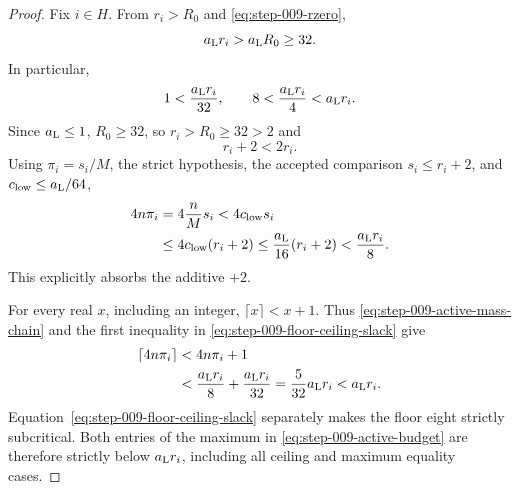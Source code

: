 \begin{proof}
Fix \(i\in H\).  From \(r_i>R_0\) and
\eqref{eq:step-009-rzero},
\begin{equation}\label{eq:step-009-active-slack}
a_{\rm L}r_i>a_{\rm L}R_0\ge32.
\end{equation}
In particular,
\begin{equation}\label{eq:step-009-floor-ceiling-slack}
1<\frac{a_{\rm L}r_i}{32},
\qquad
8<\frac{a_{\rm L}r_i}{4}<a_{\rm L}r_i.
\end{equation}
Since \(a_{\rm L}\le1\), \(R_0\ge32\), so
\(r_i>R_0\ge32>2\) and
\begin{equation}\label{eq:step-009-plus-two}
r_i+2<2r_i.
\end{equation}
Using \(\pi_i=s_i/M\), the strict hypothesis, the accepted comparison
\(s_i\le r_i+2\), and \(c_{\rm low}\le a_{\rm L}/64\),
\begin{equation}\label{eq:step-009-active-mass-chain}
\begin{split}
4n\pi_i
&=4\frac nM s_i
<4c_{\rm low}s_i\\
&\le4c_{\rm low}(r_i+2)
\le\frac{a_{\rm L}}{16}(r_i+2)
<\frac{a_{\rm L}r_i}{8}.
\end{split}
\end{equation}
This explicitly absorbs the additive \(+2\).

For every real \(x\), including an integer, \(\lceil x\rceil<x+1\).
Thus \eqref{eq:step-009-active-mass-chain} and the first inequality in
\eqref{eq:step-009-floor-ceiling-slack} give
\begin{equation}\label{eq:step-009-ceiling-absorption}
\begin{split}
\left\lceil4n\pi_i\right\rceil
&<4n\pi_i+1\\
&<\frac{a_{\rm L}r_i}{8}
 +\frac{a_{\rm L}r_i}{32}
=\frac5{32}a_{\rm L}r_i
<a_{\rm L}r_i.
\end{split}
\end{equation}
Equation~\eqref{eq:step-009-floor-ceiling-slack} separately makes the
floor eight strictly subcritical.  Both entries of the maximum in
\eqref{eq:step-009-active-budget} are therefore strictly below
\(a_{\rm L}r_i\), including all ceiling and maximum equality cases.
\end{proof}

